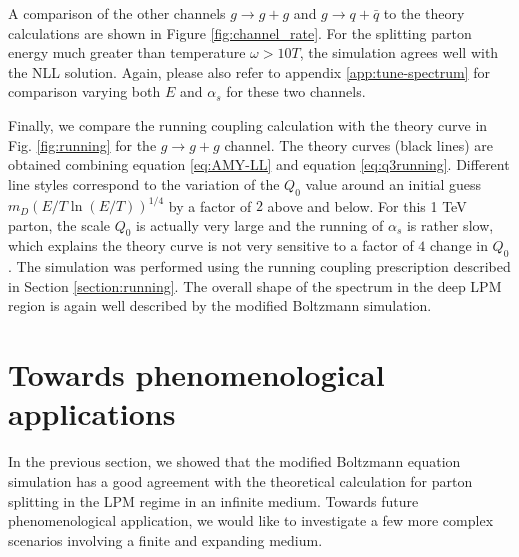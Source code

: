 \documentclass[aps, prc, reprint, amsmath, groupedaddress, nofootinbib]{revtex4-1}
\begin{document}
A comparison of the other channels $g\rightarrow g+g$ and $g\rightarrow q+\bar{q}$ to the theory calculations are shown in Figure \ref{fig:channel_rate}.
For the splitting parton energy much greater than temperature $\omega > 10 T$, the simulation agrees well with the NLL solution. 
Again, please also refer to appendix \ref{app:tune-spectrum} for comparison varying both $E$ and $\alpha_s$ for these two channels.


Finally, we compare the running coupling calculation with the theory curve in Fig. \ref{fig:running} for the $g\rightarrow g+g$ channel.
The theory curves (black lines) are obtained combining equation \ref{eq:AMY-LL} and equation \ref{eq:q3running}.
Different line styles correspond to the variation of the $Q_0$ value around an initial guess $m_D (E/T \ln(E/T) )^{1/4}$ by a factor of $2$ above and below.
For this 1 TeV parton, the scale $Q_0$ is actually very large and the running of $\alpha_s$ is rather slow, which explains the theory curve is not very sensitive to a factor of $4$ change in $Q_0$.
The simulation was performed using the running coupling prescription described in Section \ref{section:running}.
The overall shape of the spectrum in the deep LPM region is again well described by the modified Boltzmann simulation. 


\section{Towards phenomenological applications}\label{section:more}
In the previous section, we showed that the modified Boltzmann equation simulation has a good agreement with the theoretical calculation for parton splitting in the LPM regime in an infinite medium.
Towards future phenomenological application, we would like to investigate a few more complex scenarios involving a finite and expanding medium.
\end{document}

